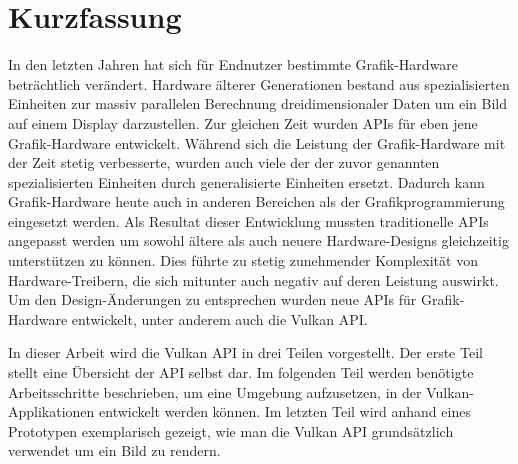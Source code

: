 
{
\chapter*{Kurzfassung}
\label{Abstract_de}
  In den letzten Jahren hat sich für Endnutzer bestimmte Grafik-Hardware beträchtlich verändert.
  Hardware älterer Generationen bestand aus spezialisierten Einheiten zur massiv parallelen Berechnung dreidimensionaler Daten um ein Bild auf einem Display darzustellen.
  Zur gleichen Zeit wurden APIs für eben jene Grafik-Hardware entwickelt.
  Während sich die Leistung der Grafik-Hardware mit der Zeit stetig verbesserte, wurden auch viele der der zuvor genannten spezialisierten Einheiten durch generalisierte Einheiten ersetzt.
  Dadurch kann Grafik-Hardware heute auch in anderen Bereichen als der Grafikprogrammierung eingesetzt werden.
  Als Resultat dieser Entwicklung mussten traditionelle APIs angepasst werden um sowohl ältere als auch neuere Hardware-Designs gleichzeitig unterstützen zu können.
  Dies führte zu stetig zunehmender Komplexität von Hardware-Treibern, die sich mitunter auch negativ auf deren Leistung auswirkt.
  Um den Design-Änderungen zu entsprechen wurden neue APIs für Grafik-Hardware entwickelt, unter anderem auch die Vulkan API.

  In dieser Arbeit wird die Vulkan API in drei Teilen vorgestellt.
  Der erste Teil stellt eine Übersicht der API selbst dar.
  Im folgenden Teil werden benötigte Arbeitsschritte beschrieben, um eine Umgebung aufzusetzen, in der Vulkan-Applikationen entwickelt werden können.
  Im letzten Teil wird anhand eines Prototypen exemplarisch gezeigt, wie man die Vulkan API grundsätzlich verwendet um ein Bild zu rendern.



\cleardoubleemptypage
}
{}

